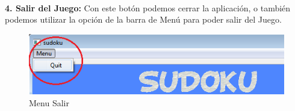 \ \\ \textbf{4. Salir del Juego:} Con este botón podemos cerrar la aplicación, o también podemos utilizar la opción de la barra de Menú para poder salir del Juego.

\begin{figure}[htbp]
\begin{center}
\includegraphics[width=.50\textwidth]{./imagenes/SeleccionMenu.png}
\caption{Menu Salir}
\label{Menu Salir}
\end{center}
\end{figure} 




